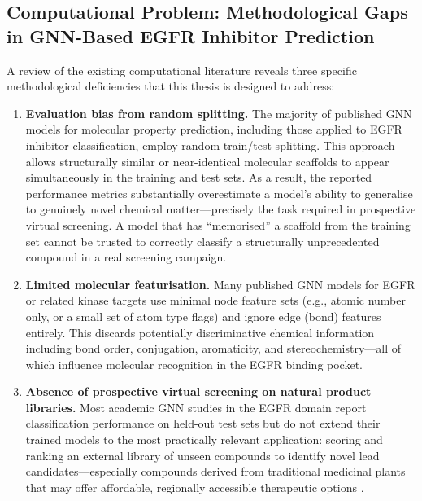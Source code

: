 \subsection{Computational Problem: Methodological Gaps in GNN-Based EGFR Inhibitor Prediction}

A review of the existing computational literature reveals three specific methodological
deficiencies that this thesis is designed to address:

\begin{enumerate}
    \item \textbf{Evaluation bias from random splitting.} The majority of published
    GNN models for molecular property prediction, including those applied to EGFR
    inhibitor classification, employ random train/test splitting. This approach allows
    structurally similar or near-identical molecular scaffolds to appear simultaneously
    in the training and test sets. As a result, the reported performance metrics
    substantially overestimate a model's ability to generalise to genuinely novel
    chemical matter---precisely the task required in prospective virtual screening.
    A model that has ``memorised'' a scaffold from the training set cannot be trusted
    to correctly classify a structurally unprecedented compound in a real screening
    campaign.

    \item \textbf{Limited molecular featurisation.} Many published GNN models for
    EGFR or related kinase targets use minimal node feature sets (e.g., atomic number
    only, or a small set of atom type flags) and ignore edge (bond) features entirely.
    This discards potentially discriminative chemical information including bond order,
    conjugation, aromaticity, and stereochemistry---all of which influence molecular
    recognition in the EGFR binding pocket.

    \item \textbf{Absence of prospective virtual screening on natural product libraries.}
    Most academic GNN studies in the EGFR domain report classification performance on
    held-out test sets but do not extend their trained models to the most practically
    relevant application: scoring and ranking an external library of unseen compounds
    to identify novel lead candidates---especially compounds derived from traditional
    medicinal plants that may offer affordable, regionally accessible therapeutic options
    \parencite{malik2025deepegfr}.
\end{enumerate}

